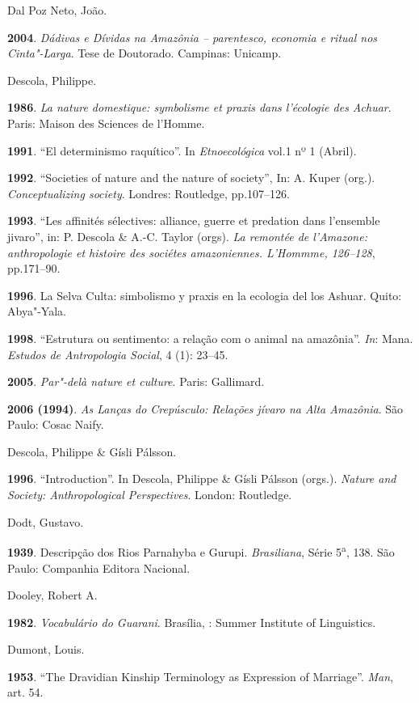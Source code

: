 Dal Poz Neto, João.

\textbf{2004}. \emph{Dádivas e Dívidas na Amazônia -- parentesco,
economia e ritual nos Cinta"-Larga}. Tese de Doutorado. Campinas:
Unicamp.

Descola, Philippe.

\textbf{1986}. \emph{La nature domestique: symbolisme et praxis dans
l'écologie des Achuar}. Paris: Maison des Sciences de l'Homme.

\textbf{1991}. ``El determinismo raquítico''. In \emph{Etnoecológica}
vol.1 nº 1 (Abril).

\textbf{1992}. ``Societies of nature and the nature of society'', In: A.
Kuper (org.). \emph{Conceptualizing society}. Londres: Routledge,
pp.107--126.

\textbf{1993}. ``Les affinités sélectives: alliance, guerre et predation
dans l'ensemble jivaro'', in: P. Descola \& A.-C. Taylor (orgs). \emph{La
remontée de l'Amazone: anthropologie et histoire des sociétes
amazoniennes. L'Hommme, 126--128}, pp.171--90.

\textbf{1996}. La Selva Culta: simbolismo y praxis en la ecologia del
los Ashuar. Quito: Abya"-Yala.

\textbf{1998}. ``Estrutura ou sentimento: a relação com o animal na
amazônia''. \emph{In}: Mana. \emph{Estudos de Antropologia Social}, 4 (1):
23--45.

\textbf{2005}. \emph{Par"-delà nature et culture}. Paris: Gallimard.

\textbf{2006 (1994)}. \emph{As Lanças do Crepúsculo: Relações jívaro na
Alta Amazônia}. São Paulo: Cosac Naify.

Descola, Philippe \& Gísli Pálsson.

\textbf{1996}. ``Introduction''. In Descola, Philippe \& Gísli Pálsson
(orgs.). \emph{Nature and Society: Anthropological Perspectives}.
London: Routledge.

Dodt, Gustavo.

\textbf{1939}. Descripção dos Rios Parnahyba e Gurupi.
\emph{Brasiliana}, Série 5\textsuperscript{{a}}, 138. São Paulo:
Companhia Editora Nacional.

Dooley, Robert A.

\textbf{1982}. \emph{Vocabulário do Guarani}. Brasília, : Summer
Institute of Linguistics.

Dumont, Louis.

\textbf{1953}. ``The Dravidian Kinship Terminology as Expression of
Marriage''. \emph{Man}, art. 54.

